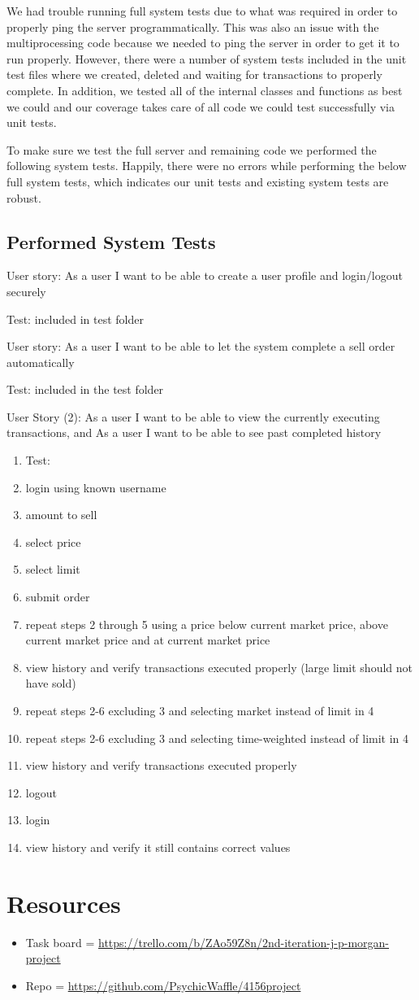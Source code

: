 \documentclass{article}
\begin{document}
We had trouble running full system tests due to what was required in order to properly ping the server programmatically. This was also an issue with the multiprocessing code because we needed to ping the server in order to get it to run properly. However, there were a number of system tests included in the unit test files where we created, deleted and waiting for transactions to properly complete. In addition, we tested all of the internal classes and functions as best we could and our coverage takes care of all code we could test successfully via unit tests.

To make sure we test the full server and remaining code we performed the following system tests. Happily, there were no errors while performing the below full system tests, which indicates our unit tests and existing system tests are robust.

\subsection{Performed System Tests}

User story: As a user I want to be able to create a user profile and login/logout securely

Test: included in test folder

User story: As a user I want to be able to let the system complete a sell order automatically

Test: included in the test folder

User Story (2): As a user I want to be able to view the currently executing transactions, and As a user I want to be able to see past completed history

\begin{enumerate}
\item 
Test:
\item login using known username
\item amount to sell
\item select price
\item select limit
\item submit order
\item repeat steps 2 through 5 using a price below current market price, above current market price and at current market price
\item view history and verify transactions executed properly (large limit should not have sold)
\item repeat steps 2-6 excluding 3 and selecting market instead of limit in 4
\item repeat steps 2-6 excluding 3 and selecting time-weighted instead of limit in 4 
\item view history and verify transactions executed properly
\item logout
\item login
\item view history and verify it still contains correct values
\end{enumerate}

\section{Resources}
\begin{itemize}
	\item Task board = \url{https://trello.com/b/ZAo59Z8n/2nd-iteration-j-p-morgan-project}
	\item Repo = \url{https://github.com/PsychicWaffle/4156project}
\end{itemize}
\end{document}
